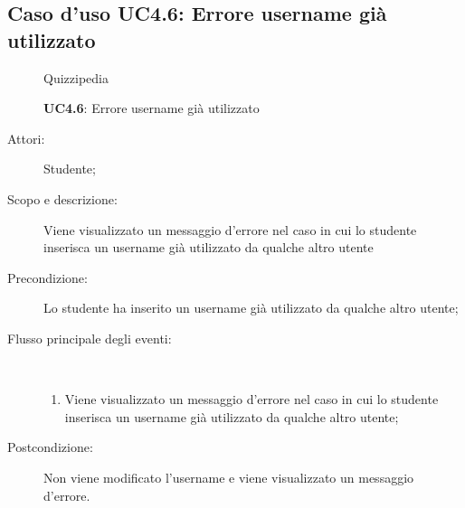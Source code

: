 \subsection{Caso d'uso UC4.6: Errore username già utilizzato}
	\begin{figure}[H]
		\centering
		\begin{resizedtikzpicture}{\textwidth}
		\begin{umlsystem}[x=0, fill=lightgray!20]{Quizzipedia}
		\end{umlsystem}
		\end{resizedtikzpicture}
		\caption{\textbf{UC4.6}: Errore username già utilizzato}
		\label{UC4.6}
	\end{figure}
\begin{description}
\item[Attori:] Studente;
\item[Scopo e descrizione:] Viene visualizzato un messaggio d'errore nel caso in cui lo studente inserisca un username già utilizzato da qualche altro utente
      \item[Precondizione:] Lo studente ha inserito un username già utilizzato da qualche altro utente;

        \item[Flusso principale degli eventi:] \ 
 \begin{enumerate}
          \item Viene visualizzato un messaggio d'errore nel caso in cui lo studente inserisca un username già utilizzato da qualche altro utente;

      \end{enumerate}
    \item[Postcondizione:] Non viene modificato l'username e viene visualizzato un messaggio d'errore.
  \end{description}
\hypertarget{UC4.7}{}
